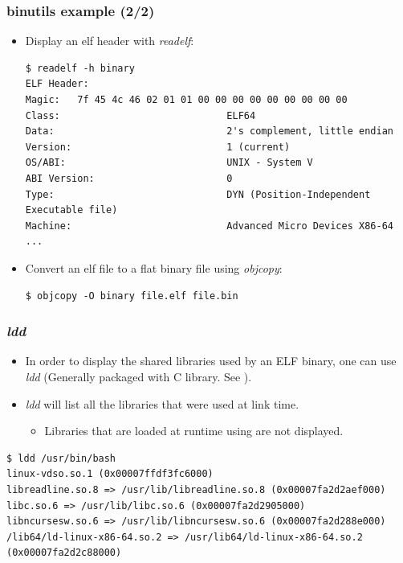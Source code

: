 \begin{frame}[fragile]
  \frametitle{binutils example (2/2)}
  \begin{itemize}
    \item Display an elf header with {\em readelf}:
    \begin{block}{}
      \begin{verbatim}
$ readelf -h binary
ELF Header:
Magic:   7f 45 4c 46 02 01 01 00 00 00 00 00 00 00 00 00
Class:                             ELF64
Data:                              2's complement, little endian
Version:                           1 (current)
OS/ABI:                            UNIX - System V
ABI Version:                       0
Type:                              DYN (Position-Independent Executable file)
Machine:                           Advanced Micro Devices X86-64
...
      \end{verbatim}
    \end{block}

    \item Convert an elf file to a flat binary file using {\em objcopy}:
    \begin{block}{}
      \begin{verbatim}
$ objcopy -O binary file.elf file.bin
      \end{verbatim}
    \end{block}
  \end{itemize}
\end{frame}


\begin{frame}[fragile]
  \frametitle{{\em ldd}}
  \begin{itemize}
    \item In order to display the shared libraries used by an ELF binary, one
          can use {\em ldd} (Generally packaged with C library. See ).
    \item {\em ldd} will list all the libraries that were used at link time.
    \begin{itemize}
      \item Libraries that are loaded at runtime using  are not
            displayed.
    \end{itemize}
  \end{itemize}
  \begin{block}{}
    \begin{verbatim}
$ ldd /usr/bin/bash
linux-vdso.so.1 (0x00007ffdf3fc6000)
libreadline.so.8 => /usr/lib/libreadline.so.8 (0x00007fa2d2aef000)
libc.so.6 => /usr/lib/libc.so.6 (0x00007fa2d2905000)
libncursesw.so.6 => /usr/lib/libncursesw.so.6 (0x00007fa2d288e000)
/lib64/ld-linux-x86-64.so.2 => /usr/lib64/ld-linux-x86-64.so.2 (0x00007fa2d2c88000)
    \end{verbatim}
  \end{block}
\end{frame}

